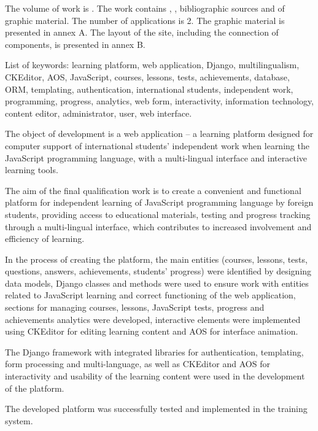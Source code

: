   
The volume of work is . The work contains , ,  bibliographic sources and  of graphic material. The number of applications is 2. The graphic material is presented in annex A. The layout of the site, including the connection of components, is presented in annex B.

List of keywords: learning platform, web application, Django, multilingualism, CKEditor, AOS, JavaScript, courses, lessons, tests, achievements, database, ORM, templating, authentication, international students, independent work, programming, progress, analytics, web form, interactivity, information technology, content editor, administrator, user, web interface.

The object of development is a web application -- a learning platform designed for computer support of international students' independent work when learning the JavaScript programming language, with a multi-lingual interface and interactive learning tools.

The aim of the final qualification work is to create a convenient and functional platform for independent learning of JavaScript programming language by foreign students, providing access to educational materials, testing and progress tracking through a multi-lingual interface, which contributes to increased involvement and efficiency of learning.

In the process of creating the platform, the main entities (courses, lessons, tests, questions, answers, achievements, students' progress) were identified by designing data models, Django classes and methods were used to ensure work with entities related to JavaScript learning and correct functioning of the web application, sections for managing courses, lessons, JavaScript tests, progress and achievements analytics were developed, interactive elements were implemented using CKEditor for editing learning content and AOS for interface animation.

The Django framework with integrated libraries for authentication, templating, form processing and multi-language, as well as CKEditor and AOS for interactivity and usability of the learning content were used in the development of the platform.

The developed platform was successfully tested and implemented in the training system.
